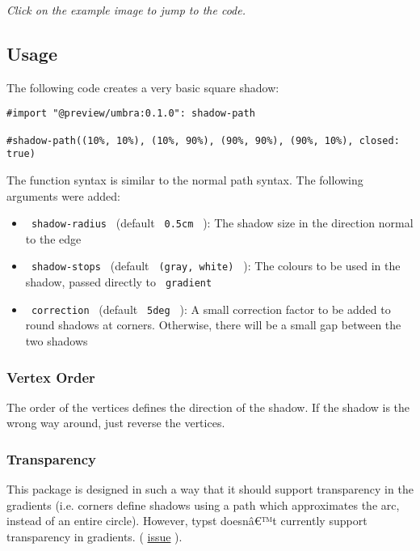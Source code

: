 \emph{Click on the example image to jump to the code.}

\subsection{Usage}\label{usage}

The following code creates a very basic square shadow:

\begin{verbatim}
#import "@preview/umbra:0.1.0": shadow-path

#shadow-path((10%, 10%), (10%, 90%), (90%, 90%), (90%, 10%), closed: true)
\end{verbatim}

The function syntax is similar to the normal path syntax. The following
arguments were added:

\begin{itemize}
\tightlist
\item
  \texttt{\ shadow-radius\ } (default \texttt{\ 0.5cm\ } ): The shadow
  size in the direction normal to the edge
\item
  \texttt{\ shadow-stops\ } (default \texttt{\ (gray,\ white)\ } ): The
  colours to be used in the shadow, passed directly to
  \texttt{\ gradient\ }
\item
  \texttt{\ correction\ } (default \texttt{\ 5deg\ } ): A small
  correction factor to be added to round shadows at corners. Otherwise,
  there will be a small gap between the two shadows
\end{itemize}

\subsubsection{Vertex Order}\label{vertex-order}

The order of the vertices defines the direction of the shadow. If the
shadow is the wrong way around, just reverse the vertices.

\subsubsection{Transparency}\label{transparency}

This package is designed in such a way that it should support
transparency in the gradients (i.e. corners define shadows using a path
which approximates the arc, instead of an entire circle). However, typst
doesnâ€™t currently support transparency in gradients. (
\href{https://github.com/typst/typst/issues/2546}{issue} ).

